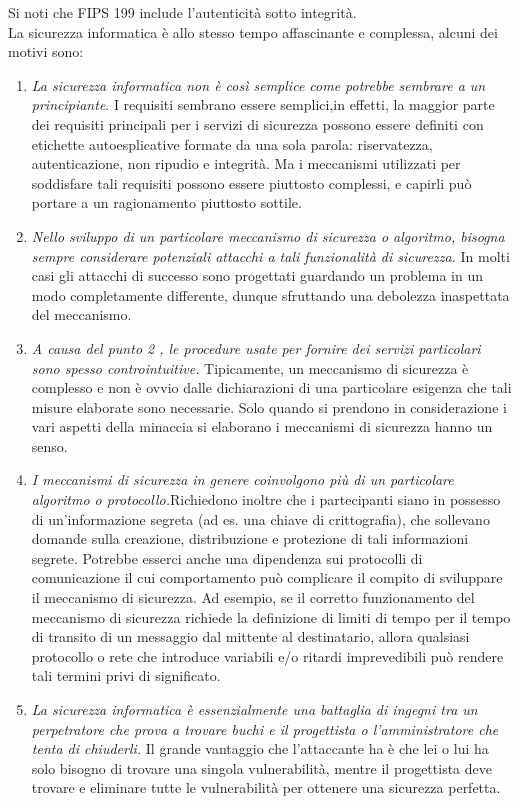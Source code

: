 Si noti che FIPS 199 include l'autenticità sotto integrità.\\

La sicurezza informatica è allo stesso tempo affascinante e complessa, alcuni dei motivi sono:
\begin{enumerate}
    \item \textit{La sicurezza informatica non è così semplice come potrebbe sembrare a un principiante}. I requisiti sembrano essere semplici,in effetti, la maggior parte dei requisiti principali per i servizi di sicurezza possono essere definiti con etichette autoesplicative formate da una sola parola: riservatezza, autenticazione, non ripudio e integrità. Ma i meccanismi utilizzati per soddisfare tali requisiti possono essere piuttosto complessi, e capirli può portare a un ragionamento piuttosto sottile.
    \item \textit{Nello sviluppo di un particolare meccanismo di sicurezza o algoritmo, bisogna sempre considerare potenziali attacchi a tali funzionalità di sicurezza.} In molti casi gli attacchi di successo sono progettati guardando un problema in un modo completamente differente, dunque sfruttando una debolezza inaspettata del meccanismo.
    \item \textit{A causa del punto 2 , le procedure usate per fornire dei servizi particolari sono spesso controintuitive.} Tipicamente, un meccanismo di sicurezza è complesso e non è ovvio dalle dichiarazioni di una particolare esigenza che tali misure elaborate sono necessarie. Solo quando si prendono in considerazione i vari aspetti della minaccia si elaborano i meccanismi di sicurezza hanno un senso.
    \item \textit{I meccanismi di sicurezza in genere coinvolgono più di un particolare algoritmo o
              protocollo.}Richiedono inoltre che i partecipanti siano in possesso di un'informazione segreta (ad es. una chiave di crittografia), che sollevano domande sulla creazione, distribuzione e protezione di tali informazioni segrete. Potrebbe esserci anche una dipendenza sui protocolli di comunicazione il cui comportamento può complicare il compito di sviluppare il meccanismo di sicurezza. Ad esempio, se il corretto funzionamento del meccanismo di sicurezza richiede la definizione di limiti di tempo per il tempo di transito di un messaggio dal mittente al destinatario, allora qualsiasi protocollo o rete che introduce variabili e/o ritardi imprevedibili può rendere tali termini privi di significato.
    \item \textit{ La sicurezza informatica è essenzialmente una battaglia di ingegni tra un perpetratore che prova a  trovare buchi e il progettista o l'amministratore che tenta di chiuderli.} Il grande vantaggio che l'attaccante ha è che lei o lui ha solo bisogno di trovare una singola vulnerabilità, mentre il progettista deve trovare e eliminare tutte le vulnerabilità per ottenere una sicurezza perfetta.

\end{enumerate}
